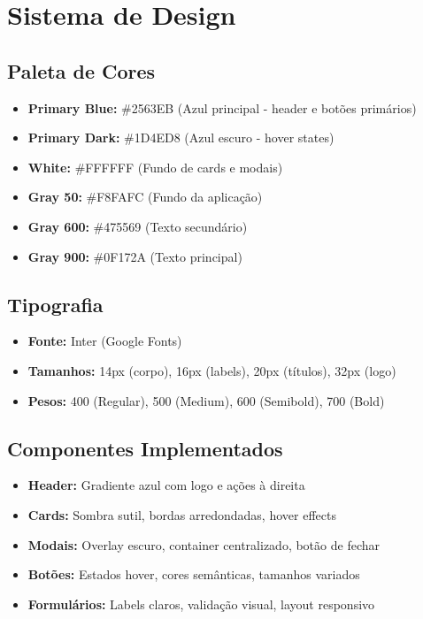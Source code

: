 \documentclass[12pt,a4paper]{article}
\begin{document}
\section{Sistema de Design}

\subsection{Paleta de Cores}

\begin{itemize}
    \item \textbf{Primary Blue:} \#2563EB (Azul principal - header e botões primários)
    \item \textbf{Primary Dark:} \#1D4ED8 (Azul escuro - hover states)
    \item \textbf{White:} \#FFFFFF (Fundo de cards e modais)
    \item \textbf{Gray 50:} \#F8FAFC (Fundo da aplicação)
    \item \textbf{Gray 600:} \#475569 (Texto secundário)
    \item \textbf{Gray 900:} \#0F172A (Texto principal)
\end{itemize}

\subsection{Tipografia}

\begin{itemize}
    \item \textbf{Fonte:} Inter (Google Fonts)
    \item \textbf{Tamanhos:} 14px (corpo), 16px (labels), 20px (títulos), 32px (logo)
    \item \textbf{Pesos:} 400 (Regular), 500 (Medium), 600 (Semibold), 700 (Bold)
\end{itemize}

\subsection{Componentes Implementados}

\begin{itemize}
    \item \textbf{Header:} Gradiente azul com logo e ações à direita
    \item \textbf{Cards:} Sombra sutil, bordas arredondadas, hover effects
    \item \textbf{Modais:} Overlay escuro, container centralizado, botão de fechar
    \item \textbf{Botões:} Estados hover, cores semânticas, tamanhos variados
    \item \textbf{Formulários:} Labels claros, validação visual, layout responsivo
\end{itemize}
\end{document}
